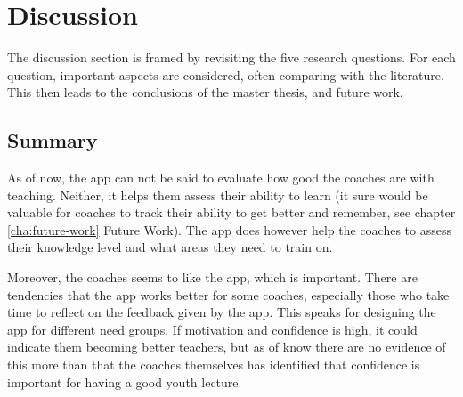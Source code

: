 \chapter{Discussion}\label{cha:discussion}



The discussion section is framed by revisiting the five research questions. For each question, important aspects are considered, often comparing with the literature. This then leads to the conclusions of the master thesis, and future work.











\section{Summary}

As of now, the app can not be said to evaluate how good the coaches are with teaching. Neither, it helps them assess their ability to learn (it sure would be valuable for coaches to track their ability to get better and remember, see chapter \ref{cha:future-work} Future Work). The app does however help the coaches to assess their knowledge level and what areas they need to train on.

Moreover, the coaches seems to like the app, which is important. There are tendencies that the app works better for some coaches, especially those who take time to reflect on the feedback given by the app. This speaks for designing the app for different need groups. If motivation and confidence is high, it could indicate them becoming better teachers, but as of know there are no evidence of this more than that the coaches themselves has identified that confidence is important for having a good youth lecture.

